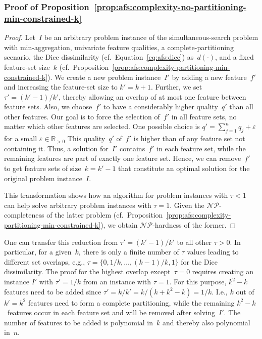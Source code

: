 \subsubsection{Proof of Proposition~\ref{prop:afs:complexity-no-partitioning-min-constrained-k}}
\label{sec:appendix:afs:proofs:complexity-no-partitioning-min-constrained-k}

\begin{proof}
	Let~$I$ be an arbitrary problem instance of the simultaneous-search problem with min-aggregation, univariate feature qualities, a complete-partitioning scenario, the Dice dissimilarity (cf.~Equation~\ref{eq:afs:dice}) as~$d(\cdot)$, and a fixed feature-set size~$k$ (cf.~Proposition~\ref{prop:afs:complexity-partitioning-min-constrained-k}).
	We create a new problem instance~$I'$ by adding a new feature~$f'$ and increasing the feature-set size to $k' = k + 1$.
	Further, we set $\tau' = (k' - 1) / k'$, thereby allowing an overlap of at most one feature between feature sets.
	Also, we choose~$f'$ to have a considerably higher quality~$q'$ than all other features.
	Our goal is to force the selection of~$f'$ in all feature sets, no matter which other features are selected.
	One possible choice is $q' = \sum_{j=1}^n q_j + \varepsilon$ for a small $\varepsilon \in \mathbb{R}_{> 0}$
	This quality~$q'$ of~$f'$ is higher than of any feature set not containing it.
	Thus, a solution for~$I'$ contains~$f'$ in each feature set, while the remaining features are part of exactly one feature set.
	Hence, we can remove~$f'$ to get feature sets of size~$k = k' - 1$ that constitute an optimal solution for the original problem instance~$I$.
	
	This transformation shows how an algorithm for problem instances with $\tau < 1$ can help solve arbitrary problem instances with $\tau = 1$.
	Given the $\mathcal{NP}$-completeness of the latter problem (cf.~Proposition~\ref{prop:afs:complexity-partitioning-min-constrained-k}), we obtain $\mathcal{NP}$-hardness of the former.
\end{proof}
%
One can transfer this reduction from $\tau' = (k' - 1) / k'$ to all other $\tau > 0$.
In particular, for a given~$k$, there is only a finite number of $\tau$ values leading to different set overlaps, e.g., $\tau = \{0, 1/k, \dots, (k - 1) / k, 1\}$ for the Dice dissimilarity.
The proof for the highest overlap except~$\tau=0$ requires creating an instance $I'$ with $\tau'= 1/k$ from an instance with $\tau = 1$.
For this purpose, $k^2 - k$ features need to be added since $\tau' = k / k' = k / (k + k^2 -k) = 1/k$.
I.e., $k$ out of $k' = k^2$ features need to form a complete partitioning, while the remaining $k^2 - k$~features occur in each feature set and will be removed after solving~$I'$.
The number of features to be added is polynomial in~$k$ and thereby also polynomial in~$n$.


